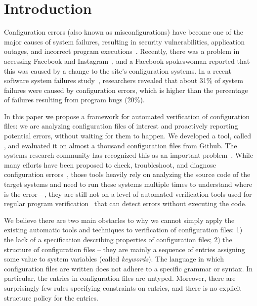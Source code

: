 \section{Introduction}
\label{sec-intro}

Configuration errors (also known as misconfigurations) have become
one of the major causes of system failures, resulting in security vulnerabilities,
application outages, and incorrect program executions~\cite{xu15systems, xu13do, xu15hey}. Recently, there was a problem in accessing  
Facebook and Instagram~\cite{mashableNews}, 
and a Facebook spokeswoman reported that 
this was caused by a change to the site's configuration systems.
In a recent software system failures study~\cite{yin11anempirical},
researchers revealed that about 31\% of system failures were caused by 
configuration errors, which is higher than the percentage of
failures resulting from program bugs (20\%).

In this paper we propose
a framework for automated verification of configuration files: we are analyzing 
configuration files of interest and proactively reporting potential errors, without waiting for them to happen. We developed a tool, called \app, 
and evaluated it on 
almost a thousand configuration files from Github. The systems research community has recognized this as an important
problem~\cite{xu16early}. While many efforts have been proposed to
check, troubleshoot, and diagnose configuration 
errors~\cite{attariyan10automating,
su07autobash, whitaker04configuration},
those tools heavily rely on analyzing the source code of 
the target systems and need to run these systems
multiple times to understand where is the error---\ie,
they are still not on a level of
automated verification tools used for regular program 
verification~\cite{Leino10Dafny, PiskacWZ14, BobotFMP15} that can
detect errors without executing the code. 

We believe there are two main obstacles 
to why we cannot simply apply  the existing automatic 
tools and techniques to verification of configuration files:
1) the lack
of a specification describing properties of configuration files;
2) the structure of configuration files -- they
are mainly a sequence of entries assigning some value to system
variables (called {\emph {keywords}}). 
The language in which configuration files are written does 
not adhere to a specific grammar or syntax. In particular, the
entries in configuration files are untyped. Moreover, there are surprisingly few rules specifying constraints on entries, and there
is no explicit structure policy for the entries.

